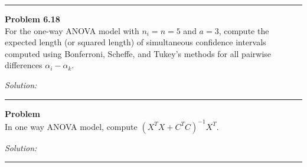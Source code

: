 \documentclass[a4paper, 11pt]{article}
\newenvironment{problem}[2][Problem]
    { \begin{mdframed}[backgroundcolor=gray!20] \textbf{#1 #2} \\}
    {  \end{mdframed}}
\newenvironment{solution}
    {\textit{Solution:}}
    {}
\begin{document}
\noindent\rule{7in}{2.8pt}

\begin{problem}{6.18}
  For the one-way ANOVA model with $n_i = n = 5$ and $a = 3$, compute the expected length (or squared length) of simultaneous confidence intervals computed using Bonferroni, Scheffe, and Tukey’s methods for all pairwise differences $\alpha_i-\alpha_k$.

\end{problem}
\begin{solution}

\end{solution}

\noindent\rule{7in}{2.8pt}

\begin{problem}{}
In one way ANOVA model, compute $(X^TX+C^TC)^{-1}X^T$.
\end{problem}
\begin{solution}

\end{solution}


\noindent\rule{7in}{2.8pt}
\end{document}
